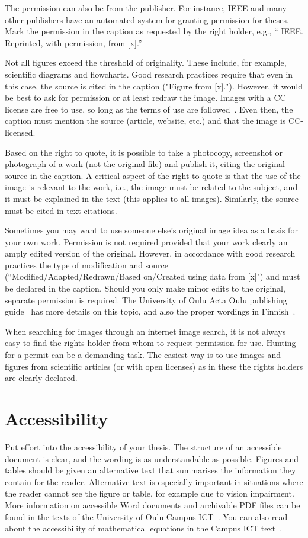 The permission can also be from the publisher. For instance, IEEE and
many other publishers have an automated system for granting permission
for theses. Mark the permission in the caption as requested by the
right holder, e.g., “ IEEE. Reprinted, with
permission, from [x].''

Not all figures exceed the threshold of originality. These include,
for example, scientific diagrams and flowcharts. Good research
practices require that even in this case, the source is cited in the
caption ("Figure from [x]."). However, it would be best to ask
for permission or at least redraw the image. Images with a CC license
are free to use, so long as the terms of use are
followed~\cite{about_cc_licenses}. Even then, the caption must mention
the source (article, website, etc.) and that the image is CC-licensed.

Based on the right to quote, it is possible to take a photocopy,
screenshot or photograph of a work (not the original file) and publish
it, citing the original source in the caption. A critical aspect of
the right to quote is that the use of the image is relevant to the
work, i.e., the image must be related to the subject, and it must be
explained in the text (this applies to all images). Similarly, the
source must be cited in text citations.

Sometimes you may want to use someone else's original image idea as a
basis for your own work. Permission is not required provided that your
work clearly an amply edited version of the original. However, in
accordance with good research practices the type of modification and
source (“Modified/Adapted/Redrawn/Based on/Created using data from
[x]") and must be declared in the caption. Should you only make minor
edits to the original, separate permission is required. The University
of Oulu Acta Oulu publishing guide~\cite{ronkainen_copyright} has more
details on this topic, and also the proper wordings in
Finnish~\cite{ronkainen_tekijanoikeus}.

When searching for images through an internet image search, it is not
always easy to find the rights holder from whom to request permission
for use. Hunting for a permit can be a demanding task. The easiest way
is to use images and figures from scientific articles (or with open
licenses) as in these the rights holders are clearly declared.

\section{Accessibility}
\label{accessibility}
Put effort into the accessibility of your thesis. The
structure of an accessible document is clear, and the wording is as
understandable as possible. Figures and tables should be given an
alternative text that summarises the information they contain for the
reader. Alternative text is especially important in situations where
the reader cannot see the figure or table, for example due to vision
impairment.  More information on accessible Word documents and
archivable PDF files can be found in the texts of the University of
Oulu Campus ICT~\cite{ictaccessibleword,ictwordpdfa}. You can also
read about the accessibility of mathematical equations in the Campus
ICT text~\cite{ictaccessiblemath}.
